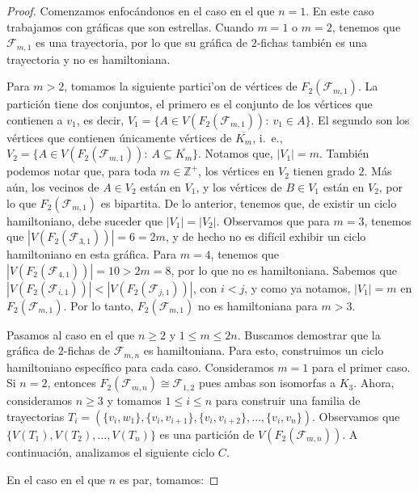 \begin{proof}
    Comenzamos enfoc\'andonos en el caso en el que $n=1$. En este caso
    trabajamos con gr\'aficas que son estrellas. Cuando $m=1$ o $m=2$, tenemos
    que $\mathcal{F}_{m,1}$ es una trayectoria, por lo que su gr\'afica de
    $2$-fichas tambi\'en es una trayectoria y no es hamiltoniana. 
    
    Para $m > 2$, tomamos la siguiente partici'on de v\'ertices de
    $F_2(\mathcal{F}_{m,1})$. La partici\'on tiene dos conjuntos, el primero es
    el conjunto de los v\'ertices que contienen a $v_1$, es decir, $V_1=\{A \in
    V(F_2(\mathcal{F}_{m,1})) \colon\ v_1 \in A\}$. El segundo son los
    v\'ertices que contienen \'unicamente v\'ertices de $\overline{K_m}$, i.~e.,
    $V_2=\{A \in V(F_2(\mathcal{F}_{m,1})) \colon\ A \subseteq \overline{K_m}
    \}$. Notamos que, $|V_1|=m$. Tambi\'en podemos notar que, para toda $m \in
    \mathbb{Z^+}$, los v\'ertices en $V_2$ tienen grado $2$. M\'as a\'un, los
    vecinos de $A \in V_2$ est\'an en $V_1$, y los v\'ertices de $B \in V_1$
    est\'an en $V_2$, por lo que $F_2(\mathcal{F}_{m,1})$ es bipartita. De lo
    anterior, tenemos que, de existir un ciclo hamiltoniano, debe suceder que
    $|V_1| = |V_2|$. Observamos que para $m=3$, tenemos que
    $|V(F_2(\mathcal{F}_{3,1}))| = 6 = 2m$, y de hecho no es dif\'icil exhibir
    un ciclo hamiltoniano en esta gr\'afica. Para $m=4$, tenemos que
    $|V(F_2(\mathcal{F}_{4,1}))| = 10 > 2m=8$, por lo que no es hamiltoniana.
    Sabemos que $|V(F_2(\mathcal{F}_{i,1}))| < |V(F_2(\mathcal{F}_{j,1}))|$, con
    $i<j$, y como ya notamos, $|V_1| = m$ en $F_2(\mathcal{F}_{m,1})$.   Por lo
    tanto, $F_2(\mathcal{F}_{m,1})$ no es hamiltoniana para $m >3$.

    Pasamos al caso en el que $n \geq 2$ y $1 \leq m \leq 2n$. Buscamos
    demostrar que la gr\'afica de $2$-fichas de $\mathcal{F}_{m,n}$ es
    hamiltoniana. Para esto, construimos un ciclo hamiltoniano espec\'ifico para
    cada caso. Consideramos $m=1$ para el primer caso. Si $n=2$, entonces
    $F_2(\mathcal{F}_{m,n}) \cong \mathcal{F}_{1,2}$ pues ambas son isomorfas a
    $K_3$. Ahora, consideramos $n \geq 3$ y tomamos $1 \leq i \leq n$ para
    construir una familia de trayectorias
    $T_i=(\{v_i,w_1\},\{v_i,v_{i+1}\},\{v_i,v_{i+2}\},\dots, \{v_i,v_n\})$.
    Observamos que $\{V(T_1),V(T_2),\dots, V(T_n)\}$ es una partici\'on de
    $V(F_2(\mathcal{F}_{m,n}))$. A continuaci\'on, analizamos el siguiente ciclo
    $C$.
    
    En el caso en el que $n$ es par, tomamos:


\end{proof}
